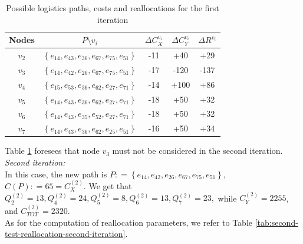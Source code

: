 \begin{table}
    \centering
    \begin{tabular}{|c|c|c|c|c|}
        \hline
        \textbf{Nodes} & \textbf{$P \setminus v_i$} & \textbf{$\Delta C_X^{v_i}$} & \textbf{$\Delta C_Y^{v_i}$} & \textbf{$\Delta R^{v_i}$} \\
        \hline
        $v_2$ & $\left\{e_{14}, e_{43}, e_{36}, e_{67}, e_{75}, e_{51} \right\}$ & -11 & +40 & +29 \\
        \hline
        $v_3$ & $\left\{e_{14}, e_{42}, e_{26}, e_{67}, e_{75}, e_{51} \right\}$ & -17 & -120 & -137 \\
        \hline
        $v_4$ & $\left\{e_{15}, e_{53}, e_{36}, e_{62}, e_{27}, e_{71} \right\}$ & -14 & +100 & +86 \\
        \hline
        $v_5$ & $\left\{e_{14}, e_{43}, e_{36}, e_{62}, e_{27}, e_{71} \right\}$ & -18 & +50 & +32 \\
        \hline
        $v_6$ & $\left\{e_{14}, e_{43}, e_{35}, e_{52}, e_{27}, e_{71} \right\}$ & -18 & +50 & +32 \\
        \hline
        $v_7$ & $\left\{e_{14}, e_{43}, e_{36}, e_{62}, e_{25}, e_{51} \right\}$ & -16 & +50 & +34 \\
        \hline
    \end{tabular}

    \caption{Possible logistics paths, costs and reallocations for the first iteration}
    \label{tab:reallocation-plan-second-it}
\end{table}

Table \ref{tab:reallocation-plan-second-it} foresees that node $v_3$ must not be considered in the second iteration.\\
\textit{Second iteration:}\\
In this case, the new path is $P : = \left\{e_{14},e_{42}, e_{26}, e_{67}, e_{75}, e_{51} \right\}$, $C(P) : = 65 = C_X^{(2)}$. We get that $Q_2^{(2)} = 13, Q_4^{(2)} = 24, Q_5^{(2)} = 8, Q_6^{(2)} = 13, Q_7^{(2)} = 23, $ while $C_Y^{(2)} = 2255$, and $C_{TOT}^{(2)} = 2320$.\\
As for the computation of reallocation parameters, we refer to Table \ref{tab:second-test-reallocation-second-iteration}.

